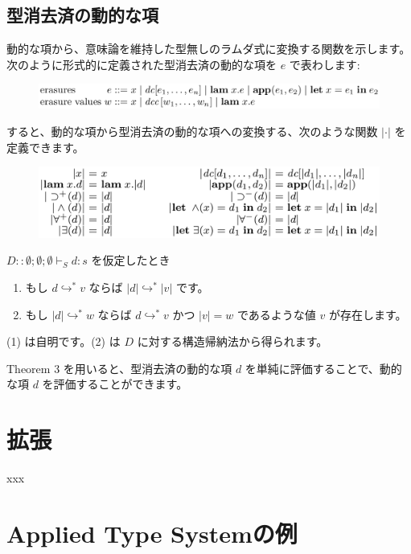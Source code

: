 \documentclass[submit,techreq,noauthor,onecolumn]{ipsj}
\begin{document}
\subsection{型消去済の動的な項}

動的な項から、意味論を維持した型無しのラムダ式に変換する関数を示します。
次のように形式的に定義された型消去済の動的な項を $e$ で表わします:

\begin{figure}[h]
\centering
\includegraphics[width=13cm]{img/infig3_erasure.png}
\end{figure}

\noindent すると、動的な項から型消去済の動的な項への変換する、次のような関数 $|\cdot|$ を定義できます。

\begin{figure}[h]
\centering
\includegraphics[width=12cm]{img/infig3_trans_erasure.png}
\end{figure}

$D :: \emptyset; \emptyset; \emptyset \vdash_S d : s$ を仮定したとき

\begin{enumerate}
  \item もし $d \hookrightarrow^* v$ ならば $|d| \hookrightarrow^* |v|$ です。
  \item もし $|d| \hookrightarrow^* w$ ならば $d \hookrightarrow^* v$ かつ $|v| = w$ であるような値 $v$ が存在します。
\end{enumerate}

(1) は自明です。(2) は $D$ に対する構造帰納法から得られます。

\noindent Theorem 3 を用いると、型消去済の動的な項 $d$ を単純に評価することで、動的な項 $d$ を評価することができます。

\section{拡張}

xxx

\section{Applied Type Systemの例}
\end{document}

